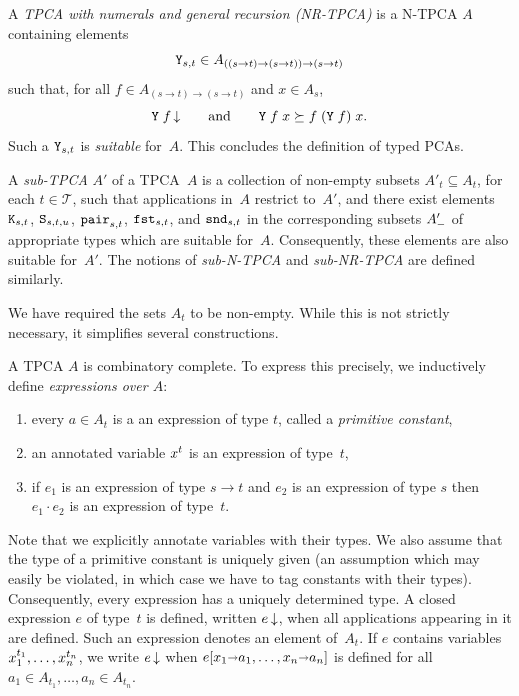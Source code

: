 A \emph{TPCA with numerals and general recursion (NR-TPCA)} is a
N-TPCA $A$ containing elements
%
\begin{equation*}
  \mathtt{Y}_{s,t} \in A_{((s \to t) \to (s \to t)) \to (s \to t)}
\end{equation*}
%
such that, for all $f \in A_{(s \to t) \to (s \to t)}$ and $x \in A_s$,
%
\begin{equation*}
  \mathtt{Y} \; f\,{\downarrow}
  \qquad\text{and}\qquad
  \mathtt{Y} \; f \; x \succeq f \; (\mathtt{Y}\; f) \; x.
\end{equation*}
%
Such a $\mathtt{Y}_{s,t}$ is \emph{suitable} for~$A$. This concludes the
definition of typed PCAs.

A \emph{sub-TPCA} $A'$ of a TPCA~$A$ is a collection of non-empty
subsets $A'_t \subseteq A_t$, for each $t \in \mathcal{T}$, such that
applications in~$A$ restrict to~$A'$, and there exist elements
$\mathtt{K}_{s,t}$, $\mathtt{S}_{s,t,u}$, $\mathtt{pair}_{s,t}$, $\mathtt{fst}_{s,t}$,
and $\mathtt{snd}_{s,t}$ in the corresponding subsets $A'_{{-}}$ of
appropriate types which are suitable for~$A$. Consequently, these
elements are also suitable for~$A'$. The notions of \emph{sub-N-TPCA}
and \emph{sub-NR-TPCA} are defined similarly.

We have required the sets $A_t$ to be non-empty. While this is not
strictly necessary, it simplifies several constructions.

A TPCA $A$ is combinatory complete. To express this precisely, we
inductively define \emph{expressions over $A$}:
%
\begin{enumerate}
\item every $a \in A_t$ is a an expression of type $t$, called a
  \emph{primitive constant},
\item an annotated variable $x^{t}$ is an expression of type~$t$,
\item if $e_1$ is an expression of type $s \to t$ and $e_2$ is an
  expression of type $s$ then $e_1 \cdot e_2$ is an expression of
  type~$t$.
\end{enumerate}
%
Note that we explicitly annotate variables with their types. We also
assume that the type of a primitive constant is uniquely given (an
assumption which may easily be violated, in which case we have to tag
constants with their types).
Consequently, every expression has a uniquely determined type. A
closed expression $e$ of type~$t$ is defined, written $e\,{\downarrow}$,
when all applications appearing in it are defined. Such an expression
denotes an element of~$A_t$. If $e$ contains variables
$x_1^{t_1}, \ldots, x_n^{t_n}$, we write $e\,{\downarrow}$
when $e[x_1 {\shortrightarrow} a_1, \ldots, x_n {\shortrightarrow} a_n]$ is defined
for all $a_1 \in A_{t_1}, \ldots, a_n \in A_{t_n}$.

